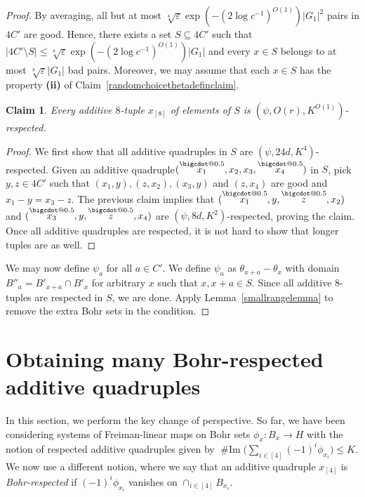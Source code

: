 \documentclass[a4paper,11pt]{article}
\makeatletter
\numberwithin{theorem}{section}
\newtheorem{claim}[theorem]{Claim}
\theoremstyle{definition}
\newcommand{\on}[1]{
	\operatorname{#1}
}
\newcommand\range{\on{\# Im}}
\newcommand*\bcdot{\mathpalette\bigcdot@{0.5}}
\newcommand*\bigcdot@[2]{\mathbin{\vcenter{\hbox{\scalebox{#2}{$\m@th#1\bullet$}}}}}
\newcommand{\upd}[1]{\overset{\bcdot}{#1}}
\makeatother
\begin{document}
\begin{proof}
    By averaging, all but at most $\sqrt[4]{\varepsilon}\exp(-(2\log c^{-1})^{O(1)})|G_1|^2$ pairs in $4C'$ are good. Hence, there exists a set $S \subseteq 4C'$ such that $|4C' \setminus S| \leq \sqrt[8]{\varepsilon}\exp(-(2\log c^{-1})^{O(1)})|G_1|$ and every $x \in S$ belongs to at most $\sqrt[8]{\varepsilon}|G_1|$ bad pairs. Moreover, we may assume that each $x \in S$ has the property \textbf{(ii)} of Claim~\ref{randomchoicethetadefinclaim}.\\

    \begin{claim}
        Every additive $8$-tuple $x_{[8]}$ of elements of $S$ is $(\psi, O(r), K^{O(1)})$-respected.
    \end{claim}

    \begin{proof}
        We first show that all additive quadruples in $S$ are $(\psi, 24d, K^4)$-respected. Given an additive quadruple$(\upd{x_1}, x_2, x_3,  \upd{x_4})$ in $S$, pick $y, z \in 4C'$ such that $(x_1, y), (z, x_2), (x_3, y)$ and $(z, x_4)$ are good and $x_1 -y = x_3 - z$. The previous claim implies that $(\upd{x_1}, y, \upd{z}, x_2)$ and $(\upd{x_3}, y, \upd{z}, x_4)$ are $(\psi, 8d, K^2)$-respected, proving the claim.\\

        Once all additive quadruples are respected, it is not hard to show that longer tuples are as well.
    \end{proof}
    
    We may now define $\psi_a$ for all $a \in C'$. We define $\psi_a$ as $\theta_{x + a} - \theta_x$ with domain $B''_a = B'_{x + a} \cap B'_x$ for arbitrary $x$ such that $x, x+a \in S$. Since all additive $8$-tuples are respected in $S$, we are done. Apply Lemma~\ref{smallrangelemma} to remove the extra Bohr sets in the condition.
\end{proof} 

\section{Obtaining many Bohr-respected additive quadruples}\label{obtmanybohrrespsection}

In this section, we perform the key change of perspective. So far, we have been considering systems of Freiman-linear maps on Bohr sets $\phi_x : B_x \to H$ with the notion of respected additive quadruples given by $\range\Big(\sum_{i \in [4]} (-1)^i \phi_{x_i}\Big) \leq K$. We now use a different notion, where we say that an additive quadruple $x_{[4]}$ is \textit{Bohr-respected} if  $(-1)^i \phi_{x_i}$ vanishes on $\cap_{i \in [4]} B_{x_i}$.
\end{document}

